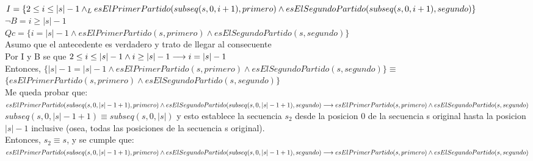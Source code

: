 \documentclass[10pt,a4paper]{article}
\begin{document}
\begin{enumerate}
\vspace{0.3cm}
\\
$I = \{ 2\leq i \leq|s|-1 \land _L esElPrimerPartido(subseq(s, 0, i+1), primero) \land esElSegundoPartido(subseq(s, 0, i+1), segundo)\}$
\vspace{0.3cm}
\\
$\neg B = i \geq |s|- 1$
\vspace{0.3cm}
\\
$Qc = \{i= \vert s \vert -1 \land esElPrimerPartido(s, primero) \land esElSegundoPartido(s, segundo)\}$
\vspace{0.3cm}
\\
Asumo que el antecedente es verdadero y trato de llegar al consecuente
\vspace{0.3cm}
\\
Por I y B se que $2 \leq i \leq |s|-1 \land i\geq |s|- 1 \longrightarrow i = |s|-1$
\vspace{0.3cm}
\\
Entonces, $\{|s|-1 = |s|-1 \land esElPrimerPartido(s, primero) \land esElSegundoPartido(s, segundo)\}\equiv$
\vspace{0.3cm}
\\
$\{esElPrimerPartido(s, primero) \land esElSegundoPartido(s, segundo)\}$
\vspace{0.3cm}
\\
Me queda probar que:
\vspace{0.3cm}
\\
$esElPrimerPartido(subseq(s, 0, |s|-1+1), primero) \land esElSegundoPartido(subseq(s, 0, |s|-1+1), segundo) \implica
\vspace{0.3cm}
\\
esElPrimerPartido(s, primero) \land esElSegundoPartido(s, segundo)$
\vspace{0.3cm}
\\
$subseq(s, 0, |s|-1+1) \equiv subseq(s, 0, |s|)$ y esto establece la secuencia $s_2$ desde la posicion 0 de la secuencia s original hasta la posicion $|s|-1$ inclusive (osea, todas las posiciones de la secuencia s original).
\vspace{0.3cm}
\\
Entonces, $s_2\equiv s$, y se cumple que:
\vspace{0.3cm}
\\
$esElPrimerPartido(subseq(s, 0, |s|-1+1), primero) \land esElSegundoPartido(subseq(s, 0, |s|-1+1), segundo) \implica
\vspace{0.3cm}
\\
esElPrimerPartido(s, primero) \land esElSegundoPartido(s, segundo)$

\end{enumerate}
\end{document}
